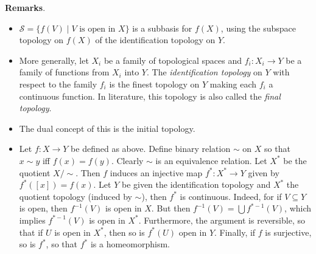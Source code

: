 \documentclass[12pt]{article}
\begin{document}
\textbf{Remarks}.
\begin{itemize}
\item
$\mathcal{S}=\lbrace f(V)\mid V\mbox{ is open in }X\rbrace$ is a subbasis for $f(X)$, using the subspace topology on $f(X)$ of the identification topology on $Y$.
\item
More generally, let $X_i$ be a family of topological spaces and $f_i:X_i\to Y$ be a family of functions from $X_i$ into $Y$.  The \emph{identification topology} on $Y$ with respect to the family $f_i$ is the finest topology on $Y$ making each $f_i$ a continuous function.  In literature, this topology is also called the \emph{final topology}.
\item
The dual concept of this is the initial topology.
\item
Let $f:X\to Y$ be defined as above.  Define binary relation $\sim$ on $X$ so that $x\sim y$ iff $f(x)=f(y)$.  Clearly $\sim$ is an equivalence relation.  Let $X^*$ be the quotient $X/\sim$.  Then $f$ induces an injective map $f^*:X^*\to Y$ given by $f^*([x])=f(x)$.  Let $Y$ be given the identification topology and $X^*$ the quotient topology (induced by $\sim$), then $f^*$ is continuous.  Indeed, for if $V\subseteq Y$ is open, then $f^{-1}(V)$ is open in $X$.  But then $f^{-1}(V)=\bigcup f^{* -1}(V)$, which implies $f^{* -1}(V)$ is open in $X^*$.  Furthermore, the argument is reversible, so that if $U$ is open in $X^*$, then so is $f^*(U)$ open in $Y$.  Finally, if $f$ is surjective, so is $f^*$, so that $f^*$ is a homeomorphism.
\end{itemize}
\end{document}
